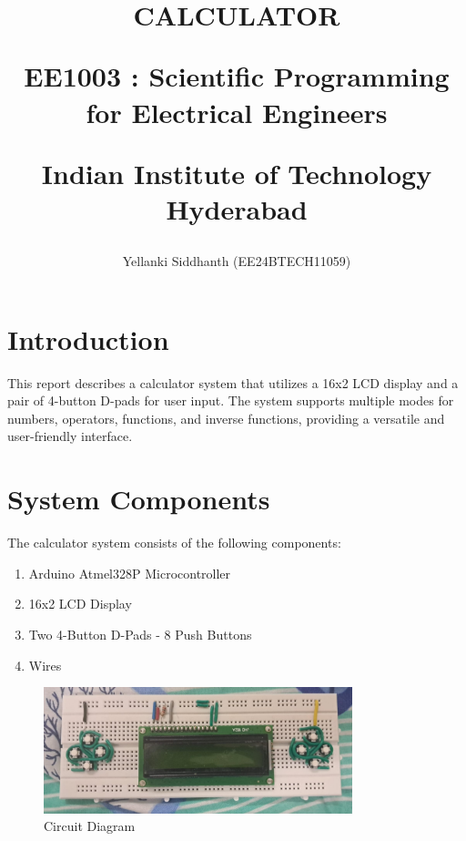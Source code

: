 \documentclass[journal]{IEEEtran}
\begin{document}
	
	
	\onecolumn
	
	\title{
		CALCULATOR
		
		\large{EE1003 : Scientific Programming for Electrical Engineers}
		
		Indian Institute of Technology Hyderabad
	}
	
	\author{Yellanki Siddhanth (EE24BTECH11059)}
	
	\maketitle
	
	\renewcommand{\thefigure}{\theenumi}
	\renewcommand{\thetable}{\theenumi}
	
	\section{Introduction}
	This report describes a calculator system that utilizes a 16x2 LCD display and a pair of 4-button D-pads for user input. The system supports multiple modes for numbers, operators, functions, and inverse functions, providing a versatile and user-friendly interface.
	
	\section{System Components}
	The calculator system consists of the following components:
	\begin{enumerate}
		\item Arduino Atmel328P Microcontroller
		\item 16x2 LCD Display
		\item Two 4-Button D-Pads - 8 Push Buttons
		\item Wires
	\end{enumerate}
	
	\begin{figure}[h!]
		\centering
		\includegraphics[width=0.8\textwidth]{figs/circuit.jpeg}
		\caption{Circuit Diagram}
	\end{figure}
	
\end{document}
